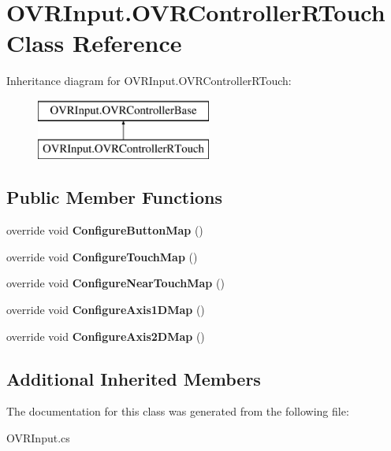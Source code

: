 \hypertarget{class_o_v_r_input_1_1_o_v_r_controller_r_touch}{}\section{O\+V\+R\+Input.\+O\+V\+R\+Controller\+R\+Touch Class Reference}
\label{class_o_v_r_input_1_1_o_v_r_controller_r_touch}
Inheritance diagram for O\+V\+R\+Input.\+O\+V\+R\+Controller\+R\+Touch\+:\begin{figure}[H]
\begin{center}
\leavevmode
\includegraphics[height=2.000000cm]{class_o_v_r_input_1_1_o_v_r_controller_r_touch}
\end{center}
\end{figure}
\subsection*{Public Member Functions}
\begin{DoxyCompactItemize}
\item 
\mbox{\label{class_o_v_r_input_1_1_o_v_r_controller_r_touch_ae3fa7b70c8dd979b65991ec8df81c385}} 
override void {\bfseries Configure\+Button\+Map} ()
\item 
\mbox{\label{class_o_v_r_input_1_1_o_v_r_controller_r_touch_a276b0ae20b23be65cd72148c3a9d2517}} 
override void {\bfseries Configure\+Touch\+Map} ()
\item 
\mbox{\label{class_o_v_r_input_1_1_o_v_r_controller_r_touch_ab8ff3206f7c2dcd76d3213651b0996eb}} 
override void {\bfseries Configure\+Near\+Touch\+Map} ()
\item 
\mbox{\label{class_o_v_r_input_1_1_o_v_r_controller_r_touch_ab3116b8aa177e532da879c333d6f652a}} 
override void {\bfseries Configure\+Axis1\+D\+Map} ()
\item 
\mbox{\label{class_o_v_r_input_1_1_o_v_r_controller_r_touch_aa982c616766bc44e5b75012b2890629c}} 
override void {\bfseries Configure\+Axis2\+D\+Map} ()
\end{DoxyCompactItemize}
\subsection*{Additional Inherited Members}


The documentation for this class was generated from the following file\+:\begin{DoxyCompactItemize}
\item 
O\+V\+R\+Input.\+cs\end{DoxyCompactItemize}
